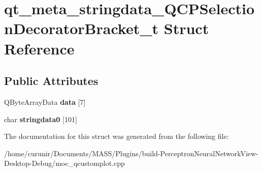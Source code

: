 \hypertarget{structqt__meta__stringdata___q_c_p_selection_decorator_bracket__t}{}\section{qt\+\_\+meta\+\_\+stringdata\+\_\+\+Q\+C\+P\+Selection\+Decorator\+Bracket\+\_\+t Struct Reference}
\label{structqt__meta__stringdata___q_c_p_selection_decorator_bracket__t}
\subsection*{Public Attributes}
\begin{DoxyCompactItemize}
\item 
Q\+Byte\+Array\+Data {\bfseries data} \mbox{[}7\mbox{]}\hypertarget{structqt__meta__stringdata___q_c_p_selection_decorator_bracket__t_a3b64cfff2eed66fb56c3b3a8d04dbbbe}{}\label{structqt__meta__stringdata___q_c_p_selection_decorator_bracket__t_a3b64cfff2eed66fb56c3b3a8d04dbbbe}

\item 
char {\bfseries stringdata0} \mbox{[}101\mbox{]}\hypertarget{structqt__meta__stringdata___q_c_p_selection_decorator_bracket__t_a9fdc0589eeaa19fcf4e22afbdbd579cd}{}\label{structqt__meta__stringdata___q_c_p_selection_decorator_bracket__t_a9fdc0589eeaa19fcf4e22afbdbd579cd}

\end{DoxyCompactItemize}


The documentation for this struct was generated from the following file\+:\begin{DoxyCompactItemize}
\item 
/home/curunir/\+Documents/\+M\+A\+S\+S/\+Plugins/build-\/\+Perceptron\+Neural\+Network\+View-\/\+Desktop-\/\+Debug/moc\+\_\+qcustomplot.\+cpp\end{DoxyCompactItemize}
